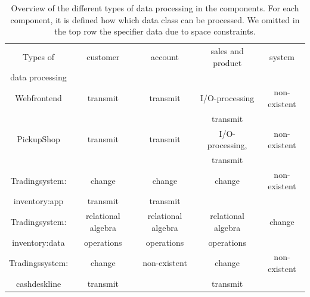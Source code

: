 \begin{table}
\begin{tabular}{|c|c|c|c|c|}
\hline 
Types of  & customer & account & sales and product & system  \\ 
data processing  & & & & \\
\hline 
Webfrontend &  transmit & transmit & I/O-processing & non-existent \\ 
& & &  transmit & \\
\hline 
PickupShop &  transmit & transmit & I/O-processing, & non-existent \\ 
& & & transmit & \\
\hline 
Tradingsystem:& change & change & change & non-existent \\ 
inventory:app & transmit& transmit & & \\
\hline 
Tradingsystem: & relational algebra& relational algebra& relational algebra& change \\
inventory:data & operations & operations & operations & \\ 
\hline
Tradingssystem: & change & non-existent & change & non-existent \\
cashdeskline & transmit &  & transmit & \\
\hline 
\end{tabular} 
\caption{Overview of the different types of data processing in the components. For each component, it is defined how which data class can be processed. We omitted in the top row the specifier data due to space constraints.}
\label{typeMatrix}
\end{table}



